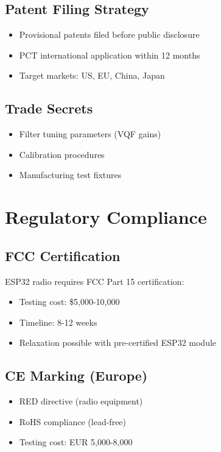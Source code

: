 \subsection{Patent Filing Strategy}

\begin{itemize}
    \item Provisional patents filed before public disclosure
    \item PCT international application within 12 months
    \item Target markets: US, EU, China, Japan
\end{itemize}

\subsection{Trade Secrets}

\begin{itemize}
    \item Filter tuning parameters (VQF gains)
    \item Calibration procedures
    \item Manufacturing test fixtures
\end{itemize}

\section{Regulatory Compliance}

\subsection{FCC Certification}

ESP32 radio requires FCC Part 15 certification:
\begin{itemize}
    \item Testing cost: \$5,000-10,000
    \item Timeline: 8-12 weeks
    \item Relaxation possible with pre-certified ESP32 module
\end{itemize}

\subsection{CE Marking (Europe)}

\begin{itemize}
    \item RED directive (radio equipment)
    \item RoHS compliance (lead-free)
    \item Testing cost: EUR 5,000-8,000
\end{itemize}

